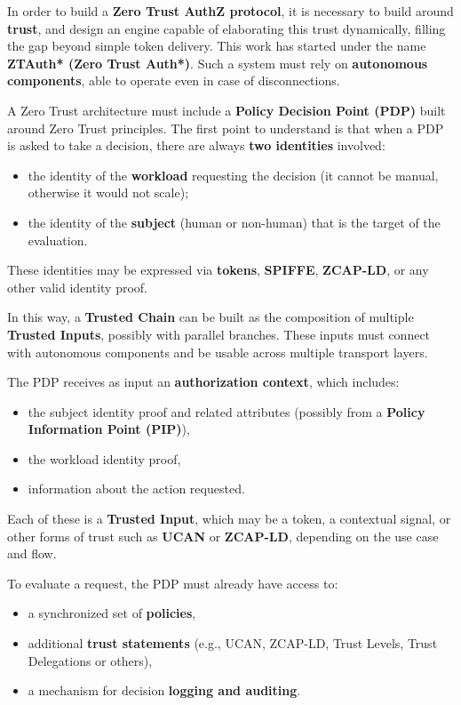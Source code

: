 In order to build a \textbf{Zero Trust AuthZ protocol}, it is necessary to build around \textbf{trust}, 
and design an engine capable of elaborating this trust dynamically, filling the gap beyond simple token delivery.  
This work has started under the name \textbf{ZTAuth* (Zero Trust Auth*)}.  
Such a system must rely on \textbf{autonomous components}, able to operate even in case of disconnections.  

\vspace{0.5em}  
A Zero Trust architecture must include a \textbf{Policy Decision Point (PDP)} built around Zero Trust principles.  
The first point to understand is that when a PDP is asked to take a decision, there are always \textbf{two identities} involved:
\begin{itemize}
    \item the identity of the \textbf{workload} requesting the decision (it cannot be manual, otherwise it would not scale);
    \item the identity of the \textbf{subject} (human or non-human) that is the target of the evaluation.
\end{itemize}
These identities may be expressed via \textbf{tokens}, \textbf{SPIFFE}, \textbf{ZCAP-LD}, or any other valid identity proof.  

\vspace{0.5em}  
In this way, a \textbf{Trusted Chain} can be built as the composition of multiple \textbf{Trusted Inputs}, 
possibly with parallel branches. These inputs must connect with autonomous components 
and be usable across multiple transport layers.

\vspace{0.5em} The PDP receives as input an \textbf{authorization context}, which includes:
\begin{itemize}
    \item the subject identity proof and related attributes (possibly from a \textbf{Policy Information Point (PIP)}),
    \item the workload identity proof,
    \item information about the action requested.
\end{itemize}
Each of these is a \textbf{Trusted Input}, which may be a token, a contextual signal, or other forms of trust such as \textbf{UCAN} or \textbf{ZCAP-LD}, depending on the use case and flow.  

\vspace{0.5em}  
To evaluate a request, the PDP must already have access to:
\begin{itemize}
    \item a synchronized set of \textbf{policies},
    \item additional \textbf{trust statements} (e.g., UCAN, ZCAP-LD, Trust Levels, Trust Delegations or others),
    \item a mechanism for decision \textbf{logging and auditing}.
\end{itemize}

